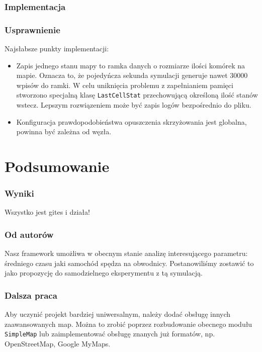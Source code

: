 \documentclass[a4paper,12pt]{article}
\begin{document}
    \section{Implementacja}

    \section{Usprawnienie}
    Najsłabsze punkty implementacji:
    
    \begin{itemize}
    	\item Zapis jednego stanu mapy to ramka danych o rozmiarze ilości komórek na mapie. Oznacza to, że pojedyńcza sekunda symulacji generuje nawet 30000 wpisów do ramki. W celu uniknięcia problemu z zapełnianiem pamięci stworzono specjalną klasę \texttt{LastCellStat} przechowującą określoną ilość stanów wstecz.
    	Lepszym rozwiązeniem może być zapis logów bezpośrednio do pliku.
    	
    	\item Konfiguracja prawdopodobieństwa opuszczenia skrzyżowania jest globalna, powinna być zależna od węzła.
    \end{itemize}

    \part{Podsumowanie}

    \section{Wyniki}
	Wszystko jest gites i działa!
		
    \section{Od autorów}
    Nasz framework umożliwa w obecnym stanie analizę interesującego parametru: średniego czasu jaki samochód spędza na obwodnicy. Postanowiliśmy zostawić to jako propozycję do samodzielnego eksperymentu z tą symulacją.

    \section{Dalsza praca}
    Aby uczynić projekt bardziej uniwersalnym, należy dodać obsługę innych zaawansowanych map.
    Można to zrobić poprzez rozbudowanie obecnego modułu \texttt{SimpleMap} lub zaimplementować obsługę znanych już formatów, np. OpenStreetMap, Google MyMaps.
    
\end{document}
